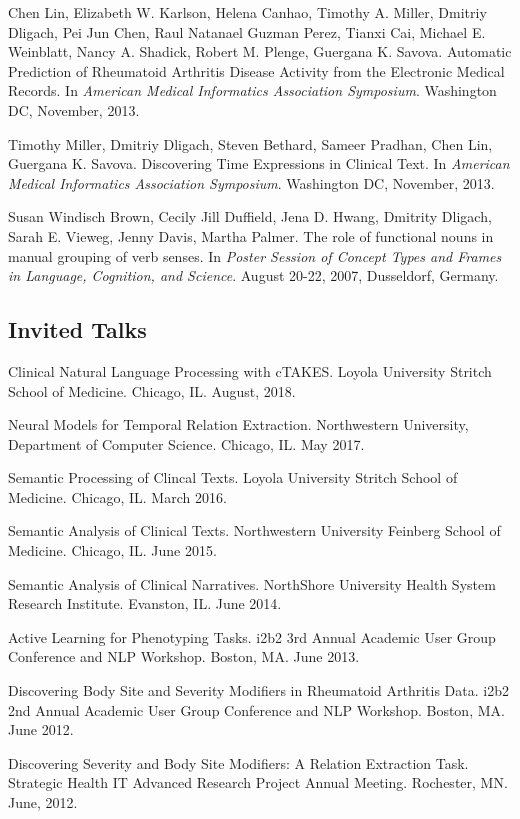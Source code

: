 \documentclass[letterpaper]{article}
\renewenvironment{itemize}{
  \begin{list}{}{
    \setlength{\leftmargin}{1.5em}
  }
}{
  \end{list}
}
\begin{document}
\begin{itemize}
\item Chen Lin, Elizabeth W. Karlson, Helena Canhao, Timothy A. Miller, Dmitriy Dligach, Pei Jun Chen, Raul Natanael Guzman Perez, Tianxi Cai, Michael E. Weinblatt, Nancy A. Shadick, Robert M. Plenge, Guergana K. Savova. Automatic Prediction of Rheumatoid Arthritis Disease Activity from the Electronic Medical Records. In \emph{American Medical Informatics Association Symposium}. Washington DC, November, 2013.
\item Timothy Miller, Dmitriy Dligach, Steven Bethard, Sameer Pradhan, Chen Lin, Guergana K. Savova. Discovering Time Expressions in Clinical Text. In \emph{American Medical Informatics Association Symposium}. Washington DC, November, 2013.
\item Susan Windisch Brown, Cecily Jill Duffield, Jena D. Hwang, Dmitrity Dligach, Sarah E. Vieweg, Jenny Davis, Martha Palmer. The role of functional nouns in manual grouping of verb senses. In \emph {Poster Session of Concept Types and Frames in Language, Cognition, and Science}. August 20-22, 2007, Dusseldorf, Germany.
\end{itemize}

\subsection*{Invited Talks}
\begin{itemize}
\item Clinical Natural Language Processing with cTAKES. Loyola University Stritch School of Medicine. Chicago, IL. August, 2018.
\item Neural Models for Temporal Relation Extraction. Northwestern University, Department of Computer Science. Chicago, IL. May 2017.
\item Semantic Processing of Clincal Texts. Loyola University Stritch School of Medicine. Chicago, IL. March 2016.
\item Semantic Analysis of Clinical Texts. Northwestern University Feinberg School of Medicine. Chicago, IL. June 2015.
\item Semantic Analysis of Clinical Narratives. NorthShore University Health System Research Institute. Evanston, IL. June 2014.
\item Active Learning for Phenotyping Tasks. i2b2 3rd Annual Academic User Group Conference and NLP Workshop. Boston, MA. June 2013.
\item Discovering Body Site and Severity Modifiers in Rheumatoid Arthritis Data. i2b2 2nd Annual Academic User Group Conference and NLP Workshop. Boston, MA. June 2012.
\item Discovering Severity and Body Site Modifiers: A Relation Extraction Task. Strategic Health IT Advanced Research Project Annual Meeting. Rochester, MN. June, 2012.
\end{itemize}
\end{document}
